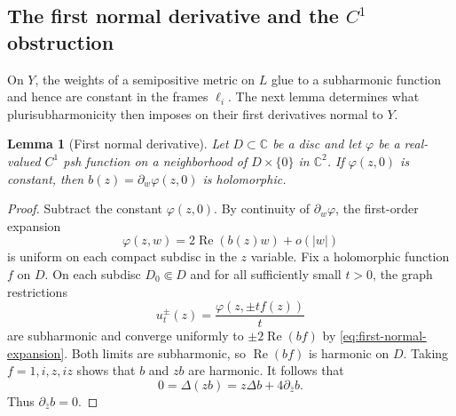 \documentclass[11pt]{amsart}
\newtheorem{lemma}[theorem]{Lemma}
\theoremstyle{definition}
\theoremstyle{remark}
\numberwithin{equation}{section}
\newcommand{\C}{\mathbb C}
\begin{document}
\subsection{The first normal derivative and the $C^1$ obstruction}

On $Y$, the weights of a semipositive metric on $L$ glue to a
subharmonic function and hence are constant in the frames $\ell_i$.
The next lemma determines what plurisubharmonicity then imposes on
their first derivatives normal to $Y$.

\begin{lemma}[First normal derivative]\label{lem:first-normal}
Let $D\subset\C$ be a disc and let $\varphi$ be a real-valued
$C^1$ psh function on a neighborhood of $D\times\{0\}$ in
$\C^2$. If $\varphi(z,0)$ is constant, then
$b(z)=\partial_w\varphi(z,0)$ is holomorphic.
\end{lemma}
\begin{proof}
Subtract the constant $\varphi(z,0)$. By continuity of
$\partial_w\varphi$, the first-order expansion
\begin{equation}\label{eq:first-normal-expansion}
 \varphi(z,w)=2\operatorname{Re}(b(z)w)+o(|w|)
\end{equation}
is uniform on each compact subdisc in the $z$ variable.
Fix a holomorphic function $f$ on $D$. On each subdisc $D_0\Subset D$
and for all sufficiently small $t>0$, the graph restrictions
\[
 u_t^\pm(z)=\frac{\varphi(z,\pm tf(z))}{t}
\]
are subharmonic and converge uniformly to
$\pm2\operatorname{Re}(bf)$ by \eqref{eq:first-normal-expansion}.
Both limits are subharmonic, so $\operatorname{Re}(bf)$ is harmonic
on $D$. Taking $f=1,i,z,iz$ shows that $b$ and $zb$ are harmonic.
It follows that
\[
 0=\Delta(zb)=z\Delta b+4\partial_{\bar z}b.
\]
Thus $\partial_{\bar z}b=0$.
\end{proof}
\end{document}

